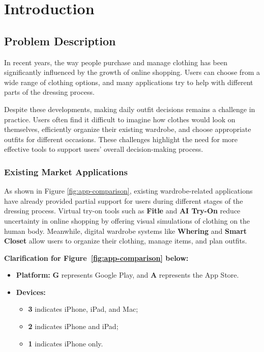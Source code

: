 \chapter{Introduction}
\label{ch:introduction}
\section{Problem Description}
In recent years, the way people purchase and manage clothing has been significantly influenced by the growth of online shopping. Users can choose from a wide range of clothing options, and many applications try to help with different parts of the dressing process.

Despite these developments, making daily outfit decisions remains a challenge in practice. Users often find it difficult to imagine how clothes would look on themselves, efficiently organize their existing wardrobe, and choose appropriate outfits for different occasions. These challenges highlight the need for more effective tools to support users' overall decision-making process.

\subsection{Existing Market Applications}
\label{chapter: Existing Market Applications}
As shown in Figure \ref{fig:app-comparison}, existing wardrobe-related applications have already provided partial support for users during different stages of the dressing process. Virtual try-on tools such as \textbf{Fitle} and \textbf{AI Try-On} reduce uncertainty in online shopping by offering visual simulations of clothing on the human body. Meanwhile, digital wardrobe systems like \textbf{Whering} and \textbf{Smart Closet} allow users to organize their clothing, manage items, and plan outfits.

\noindent\textbf{Clarification for Figure~\ref{fig:app-comparison} below:}
\begin{itemize}
    \item \textbf{Platform:} \textbf{G} represents Google Play, and \textbf{A} represents the App Store.
    \item \textbf{Devices:} 
    \begin{itemize}
        \item \textbf{3} indicates iPhone, iPad, and Mac;
        \item \textbf{2} indicates iPhone and iPad;
        \item \textbf{1} indicates iPhone only.
    \end{itemize}
\end{itemize}

